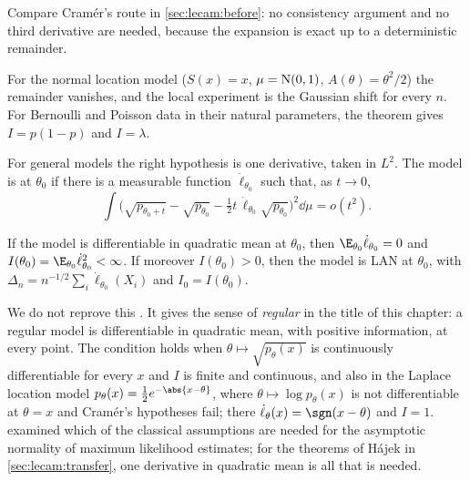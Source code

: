\begin{refsection}
Compare Cramér's route in \cref{sec:lecam:before}: no consistency argument and no third derivative are needed, because the expansion is exact up to a deterministic remainder.

For the normal location model ($S(x)=x$, $\mu=\mathrm{N}(0,1)$, $A(\theta)=\theta^2/2$) the remainder vanishes, and the local experiment is the Gaussian shift for every $n$. For Bernoulli and Poisson data in their natural parameters, the theorem gives $I=p(1-p)$ and $I=\lambda$.

For general models the right hypothesis is one derivative, taken in $L^2$. The model is  at $\theta_0$ if there is a measurable function $\dot\ell_{\theta_0}$ such that, as $t\to0$,
\[
  \int\Big(\sqrt{p_{\theta_0+t}}-\sqrt{p_{\theta_0}}-\tfrac12t\,\dot\ell_{\theta_0}\sqrt{p_{\theta_0}}\Big)^2\dd\mu=o(t^2).
\]

\begin{theorem}\label{thm:lecam:dqm}
If the model is differentiable in quadratic mean at $\theta_0$, then $\E_{\theta_0}\dot\ell_{\theta_0}=0$ and $I(\theta_0)=\E_{\theta_0}\dot\ell_{\theta_0}^2<\infty$. If moreover $I(\theta_0)>0$, then the model is LAN at $\theta_0$, with $\Delta_n=n^{-1/2}\sum_i\dot\ell_{\theta_0}(X_i)$ and $I_0=I(\theta_0)$.
\end{theorem}

We do not reprove this \parencite[Chapter~7]{vanderVaart1998}. It gives the sense of \emph{regular} in the title of this chapter: a regular model is differentiable in quadratic mean, with positive information, at every point. The condition holds when $\theta\mapsto\sqrt{p_\theta(x)}$ is continuously differentiable for every $x$ and $I$ is finite and continuous, and also in the Laplace location model $p_\theta(x)=\frac12e^{-\abs{x-\theta}}$, where $\theta\mapsto\log p_\theta(x)$ is not differentiable at $\theta=x$ and Cramér's hypotheses fail; there $\dot\ell_\theta(x)=\sgn(x-\theta)$ and $I=1$. \textcite{LeCam1970} examined which of the classical assumptions are needed for the asymptotic normality of maximum likelihood estimates; for the theorems of Hájek in \cref{sec:lecam:transfer}, one derivative in quadratic mean is all that is needed.


\end{refsection}
